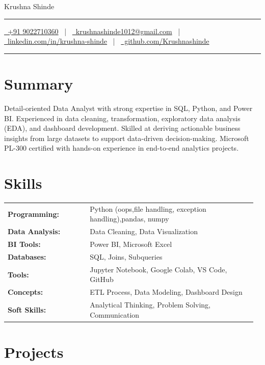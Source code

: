 \documentclass[letterpaper,10pt]{article}
\newcommand{\documentTitle}[2]{
  \begin{center}
    {\Huge\color{accentTitle} #1}\\[6pt]
    {\color{accentLine}\hrule}\vspace{2pt}
    {\footnotesize #2}\par\vspace{2pt}
    {\color{accentLine}\hrule}
  \end{center}
}
\begin{document}
\documentTitle{Krushna Shinde}{
  \href{tel:+919022710360}{\faPhone\ +91 9022710360} ~|~
  \href{mailto:krushnashinde1012@gmail.com}{\faEnvelope\ krushnashinde1012@gmail.com} ~|~
  \href{https://www.linkedin.com/in/krushna-shinde-549165276/}{\faLinkedin\ linkedin.com/in/krushna-shinde} ~|~
  \href{https://github.com/Krishna101211}{\faGithub\ github.com/Krushnashinde}
}


\section*{Summary}
Detail-oriented Data Analyst with strong expertise in SQL, Python, and Power BI. Experienced in data cleaning, transformation, exploratory data analysis (EDA), and dashboard development. Skilled at deriving actionable business insights from large datasets to support data-driven decision-making. Microsoft PL-300 certified with hands-on experience in end-to-end analytics projects.


\section*{Skills}
\begin{tabular}{p{0.32\linewidth} p{0.65\linewidth}}
  \textbf{Programming:} & Python (oops,file handling, exception handling),pandas, numpy \\
  \textbf{Data Analysis:} & Data Cleaning, Data Visualization\\
  \textbf{BI Tools:} & Power BI, Microsoft Excel \\
  \textbf{Databases:} & SQL, Joins, Subqueries \\
  \textbf{Tools:} & Jupyter Notebook, Google Colab, VS Code, GitHub \\
  \textbf{Concepts:} & ETL Process, Data Modeling, Dashboard Design \\
  \textbf{Soft Skills:} & Analytical Thinking, Problem Solving, Communication \\
\end{tabular}


\section*{Projects}
\end{document}

